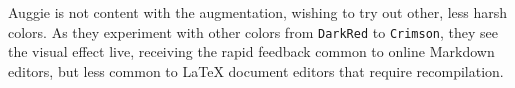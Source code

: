 Auggie is not content with the augmentation, wishing to try out other, less harsh colors. As they experiment with other colors from \texttt{DarkRed} to \texttt{Crimson}, they see the visual effect live, 
receiving the rapid feedback common to online Markdown editors, but less common to LaTeX document editors that require recompilation. \\[1ex]


